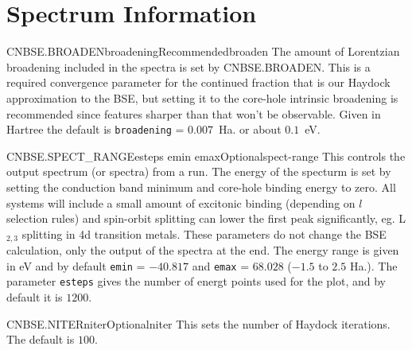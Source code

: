 \documentclass[11pt]{report}
\begin{document}
\section{Spectrum Information}
\label{sec:Spectrum-Information}
\begin{Card}{CNBSE.BROADEN}{broadening}{Recommended}{broaden}
The amount of Lorentzian broadening included in the spectra is set by CNBSE.BROADEN. This is a required convergence parameter for the continued fraction that is our Haydock approximation to the BSE, but setting it to the core-hole intrinsic broadening is recommended since features sharper than that won't be observable. Given in Hartree the default is \texttt{broadening} = $0.007$~Ha. or about $0.1$~eV.
\end{Card}

\begin{Card}{CNBSE.SPECT\_RANGE}{esteps emin emax}{Optional}{spect-range}
This controls the output spectrum (or spectra) from a run. The energy of the specturm is set by setting the conduction band minimum and core-hole binding energy to zero. All systems will include a small amount of excitonic binding (depending on $l$ selection rules) and spin-orbit splitting can lower the first peak significantly, eg. L$_{2,3}$ splitting in 4d transition metals. These parameters do not change the BSE calculation, only the output of the spectra at the end. The energy range is given in eV and by default \texttt{emin} = $-40.817$ and \texttt{emax} = $68.028$ ($-1.5$ to $2.5$ Ha.). The parameter \texttt{esteps} gives the number of energt points used for the plot, and by default it is $1200$.
\end{Card}

\begin{Card}{CNBSE.NITER}{niter}{Optional}{niter}
This sets the number of Haydock iterations. The default is $100$.
\end{Card}






%
\end{document}
